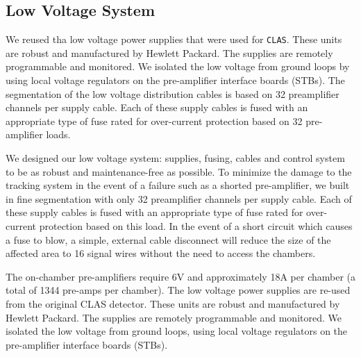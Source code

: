  
\subsection{Low Voltage System}
We reused tha low voltage power supplies that were used for {\tt CLAS}.  
These units are robust and manufactured by Hewlett Packard.  
The supplies are remotely programmable and monitored.   We 
isolated the low voltage from 
ground loops by using local voltage regulators on the pre-amplifier interface 
boards (STBs).  The segmentation of the low voltage distribution cables is 
based on 32 preamplifier channels per supply cable.  Each of these supply 
cables is fused with an appropriate type of fuse rated for over-current 
protection based on 32 pre-amplifier loads.  

We designed our low voltage system: supplies, fusing, cables and control
system to be as robust and maintenance-free as possible.  To minimize
the damage to the tracking system in the event of a failure such as
a shorted pre-amplifier, we built in fine segmentation with only
32 preamplifier channels per supply cable.  Each of these supply 
cables is fused with an appropriate type of fuse rated for over-current 
protection based on this load.
In the event of a short circuit which causes a fuse to blow,
a simple, external cable disconnect will reduce the size of the affected
area to 16 signal wires without the need to access the chambers.

The on-chamber pre-amplifiers require 6V and approximately 18A per chamber
(a total of 1344 pre-amps per chamber).
The low voltage power supplies are re-used from the original CLAS detector.  
These units are robust and manufactured by Hewlett Packard.  
The supplies are remotely programmable and monitored.   We 
isolated the low voltage from 
ground loops, using local voltage regulators on the pre-amplifier interface 
boards (STBs).  

